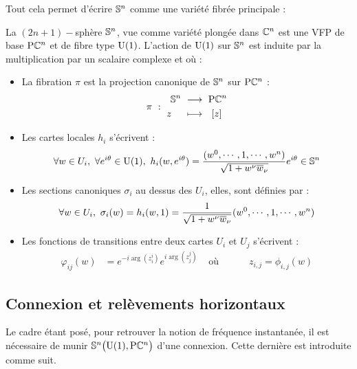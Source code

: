 Tout cela permet d'écrire $\S{n}$ comme une variété fibrée principale :
\begin{proposition}
	La $(2n+1)-$sphère $\S{n}$, vue comme variété plongée dans $\C^n$ est une VFP de base $\PC{n}$ et de fibre type $\U{1}$. L'action de $\U{1}$ sur $\S{n}$ est induite par la multiplication par un scalaire complexe et où :
	\begin{itemize}
		\item La fibration $\pi$ est la projection canonique de $\S{n}$ sur $\PC{n}$ :
		\begin{equation}
			\pi\ :\ \begin{aligned} \S{n}\ &\lr\ \PC{n} \\ z\quad\ &\lmt\ \ [z]\end{aligned}
		\end{equation}
		
		\item Les cartes locales $h_i$ s'écrivent :
		\begin{equation}
			\forall w \in U_i,\ \forall e^{i\theta}\in\U{1},\  h_i(w,e^{i\theta}) = \frac{(w^0,\cdots, 1,\cdots, w^n)}{\sqrt{1 + w^\nu \congu{w}_\nu}}e^{i\theta} \in \S{n}
		\end{equation}
		
		\item Les sections canoniques $\sigma_i$ au dessus des $U_i$, elles,  sont définies par :
		\begin{equation}
			\forall w \in U_i,\ \sigma_i(w) = h_i(w, 1) = \frac{1}{\sqrt{1 + w^\nu \congu{w}_\nu}}(w^0,\cdots, 1,\cdots, w^n)
		\end{equation}
		
		\item Les fonctions de transitions entre deux cartes $U_i$ et $U_j$ s'écrivent :
		\begin{align}
			\varphi_{ij}(w) &= e^{-i \arg (z_i^i)} e^{i \arg (z_j^j)}  &  \text{ où }&\qquad z_{i,j} = \phi_{i,j}(w)
		\end{align}
	\end{itemize}
\end{proposition}
\skipl




\subsection{Connexion et relèvements horizontaux}\label{subsec:connexion2VFP}

Le cadre étant posé, pour retrouver la notion de fréquence instantanée, il est nécessaire de munir $\VFP$ d'une connexion. Cette dernière est introduite comme suit.

